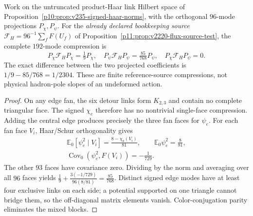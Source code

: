 \documentclass[12pt,a4paper]{article}
\begin{document}
\begin{theorem}
\label{p11:thm:v235-signed-face-source-compression}
Work on the untruncated product-Haar link Hilbert space of
Proposition~\ref{p10:prop:v235-signed-haar-norms}, with the
orthogonal \(96\)-mode projections \(P_\chi,P_\psi\).
For the \emph{already declared bookkeeping source}
\(\mathcal F_H=96^{-1}\sum_fF(U_f)\) of
Proposition~\ref{p11:prop:v2220-flux-source-test}, the complete
\(192\)-mode compression is
\[
 \boxed{P_\chi\mathcal F_HP_\chi=\tfrac19P_\chi,
 \quad P_\psi\mathcal F_HP_\psi=\tfrac{85}{768}P_\psi,
 \quad P_\chi\mathcal F_HP_\psi=0.}
\]
The exact difference between the two projected coefficients is
\(1/9-85/768=1/2304\).  These are finite reference-source
compressions, not physical hadron-pole slopes of an undeformed action.
\end{theorem}
\begin{proof}
On any edge fan, the six detour links form \(K_{2,3}\) and contain
no complete triangular face.  The signed \(\chi_e\) therefore has
no nontrivial single-face compression.  Adding the central edge
produces precisely the three fan faces for \(\psi_e\).
For each fan face \(V_i\), Haar/Schur orthogonality gives
\[
 \begin{gathered}
 \mathbb E_0[\psi_e^2\mid V_i]
    =\frac{8-\chi_8(V_i)}{81},\qquad
 \mathbb E_0\psi_e^2=\frac8{81},\\
 \operatorname{Cov}_0(\psi_e^2,F(V_i))=-\frac1{729}.
 \end{gathered}
\]
The other \(93\) faces have covariance zero.  Dividing by the
norm and averaging over all \(96\) faces yields
\(\tfrac19+\tfrac{3(-1/729)}{96(8/81)}=\tfrac{85}{768}\).
Distinct signed edge modes have at least four exclusive links on
each side; a potential supported on one triangle cannot bridge
them, so the off-diagonal matrix elements vanish.
Color-conjugation parity eliminates the mixed blocks.
\end{proof}
\end{document}
